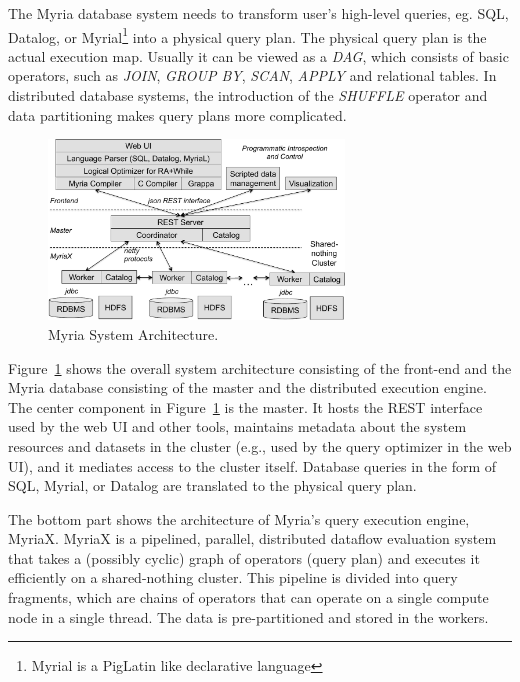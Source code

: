 \documentclass[11pt]{scrartcl}
\begin{document}
The Myria database system needs to transform user's high-level queries, eg. SQL, Datalog, or Myrial\footnote{Myrial is a PigLatin like declarative language} into a physical query plan. The physical query plan is the actual execution map. Usually it can be viewed as a \emph{DAG}, which consists of basic operators, such as \emph{JOIN}, \emph{GROUP BY}, \emph{SCAN}, \emph{APPLY} and relational tables. In distributed database systems, the introduction of the \emph{SHUFFLE} operator and data partitioning makes query plans more complicated.

\begin{figure}
 \begin{center}
     \includegraphics[width=0.7\textwidth]{arch}
   \end{center}
  \caption{Myria System Architecture.}
  \label{fig:myria_arc}
\end{figure}

Figure~\ref{fig:myria_arc} shows the overall system architecture consisting of the front-end and the Myria database consisting of the master and the distributed execution engine. The center component in Figure~\ref{fig:myria_arc} is the master. It hosts the REST interface used by the web UI and other tools, maintains metadata about the system resources and datasets in the cluster (e.g., used by the query optimizer in the web UI), and it mediates access to the cluster itself. Database queries in the form of SQL, Myrial, or Datalog are translated to the physical query plan.

The bottom part shows the architecture of Myria’s query execution engine, MyriaX. MyriaX is a pipelined, parallel, distributed dataflow evaluation system that takes a (possibly cyclic) graph of operators (query plan) and executes it efficiently on a shared-nothing cluster. This pipeline is divided into query fragments, which are chains of operators that can operate on a single compute node in a single thread. The data is pre-partitioned and stored in the workers.
\end{document}
